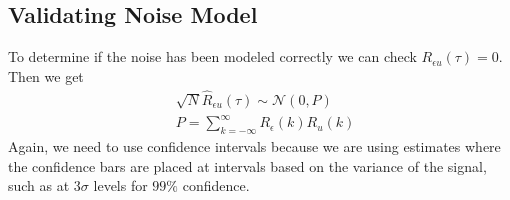 \subsection{Validating Noise Model}
To determine if the noise has been modeled correctly we can check $R_{\epsilon u}(\tau)=0$. Then we get
\begin{align*}
&\sqrt{N}\hat{R}_{\epsilon u}(\tau) \sim \mathcal{N}(0,P) \\
&P = \sum_{k=-\infty}^\infty R_\epsilon(k)R_u(k)
\end{align*}
Again, we need to use confidence intervals because we are using estimates where the confidence bars are placed at intervals based on the variance of the signal, such as at $3\sigma$ levels for $99\%$ confidence.
